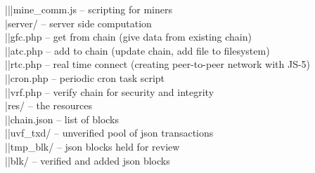 \begin{footnotesize}
|\myTab |\myTab |\myTab mine\_comm.js -- scripting for miners \\
|\myTab	server/ -- server side computation \\
|\myTab |\myTab gfc.php -- get from chain (give data from existing chain) \\
|\myTab |\myTab atc.php -- add to chain (update chain, add file to filesystem) \\
|\myTab |\myTab rtc.php -- real time connect (creating peer-to-peer network with JS-5) \\
|\myTab |\myTab cron.php -- periodic cron task script \\
|\myTab |\myTab vrf.php -- verify chain for security and integrity \\
|\myTab res/ -- the resources  \\
|\myTab |\myTab chain.json -- list of blocks \\
|\myTab |\myTab uvf\_txd/ -- unverified pool of json transactions \\
|\myTab |\myTab tmp\_blk/ -- json blocks held for review \\
|\myTab |\myTab blk/ -- verified and added json blocks \\
\end{footnotesize}

